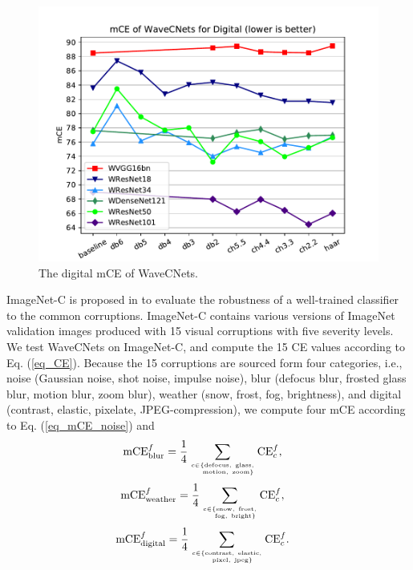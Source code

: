 \begin{figure}[bpt]
	\centering
	\includegraphics*[scale=0.6, viewport=23 4 416 320]{figures/mCE_digital.pdf}
	\caption{The digital mCE of WaveCNets.}
	\label{fig_mCE_digital}
\end{figure}

ImageNet-C is proposed in \cite{hendrycks2019benchmarking} to evaluate the robustness of a well-trained classifier to the common corruptions.
ImageNet-C contains various versions of ImageNet validation images produced with 15 visual corruptions with five severity levels.
We test WaveCNets on ImageNet-C, and compute the 15 CE values according to Eq. (\ref{eq_CE}).
Because the 15 corruptions are sourced form four categories,
i.e., noise (Gaussian noise, shot noise, impulse noise), blur (defocus blur, frosted glass blur, motion blur, zoom blur),
weather (snow, frost, fog, brightness), and digital (contrast, elastic, pixelate, JPEG-compression),
we compute four mCE according to Eq. (\ref{eq_mCE_noise}) and
\begin{align}
\label{eq_mCE_blur}
\text{mCE}_{\text{blur}}^f &= \dfrac{1}{4}\sum_{ c\in  \{\text{defocus},\ \text{glass}, \atop \quad\text{motion},\ \text{zoom}\}} \text{CE}_c^f,
\end{align}
\begin{align}
\label{eq_mCE_weather}
\text{mCE}_{\text{weather}}^f &= \dfrac{1}{4}\sum_{ c\in  \{\text{snow},\ \text{frost}, \atop \quad\text{fog},\ \text{bright}\}} \text{CE}_c^f,
\end{align}
\begin{align}
\label{eq_mCE_digital}
\text{mCE}_{\text{digital}}^f &= \dfrac{1}{4}\sum_{ c\in  \{\text{contrast},\ \text{elastic}, \atop \quad\text{pixel},\ \text{jpeg}\}} \text{CE}_c^f.
\end{align}

